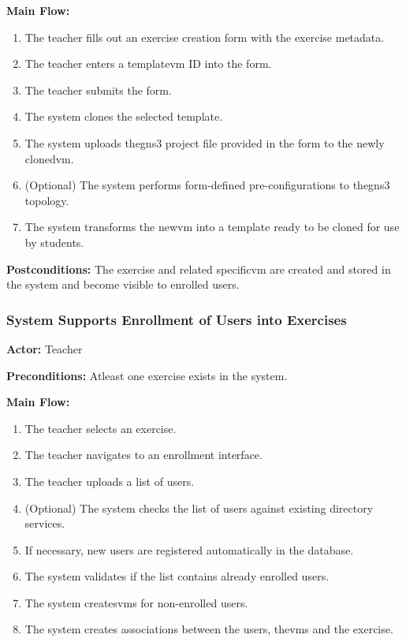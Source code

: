             \textbf{Main Flow:}
            \begin{enumerate}
                \item The teacher fills out an exercise creation form with the exercise metadata.
                \item The teacher enters a template\ac{vm} ID into the form.
                \item The teacher submits the form.
                \item The system clones the selected template.
                \item The system uploads the\ac{gns3} project file provided in the form to the newly cloned\ac{vm}.
                \item (Optional) The system performs form-defined pre-configurations to the\ac{gns3} topology.
                \item The system transforms the new\ac{vm} into a template ready to be cloned for use by students.
            \end{enumerate}

            \textbf{Postconditions:} The exercise and related specific\ac{vm} are created and stored in the system and 
            become visible to enrolled users.

        \subsubsection{System Supports Enrollment of Users into Exercises}
        \label{sec:enlist_users}
            \textbf{Actor:} Teacher

            \textbf{Preconditions:} Atleast one exercise exists in the system.

            \textbf{Main Flow:}
            \begin{enumerate}
                \item The teacher selects an exercise.
                \item The teacher navigates to an enrollment interface.
                \item The teacher uploads a list of users.
                \item (Optional) The system checks the list of users against existing directory services.
                \item If necessary, new users are registered automatically in the database.
                \item The system validates if the list contains already enrolled users.
                \item The system creates\ac{vm}s for non-enrolled users.
                \item The system creates associations between the users, the\ac{vm}s and the exercise.
            \end{enumerate}

